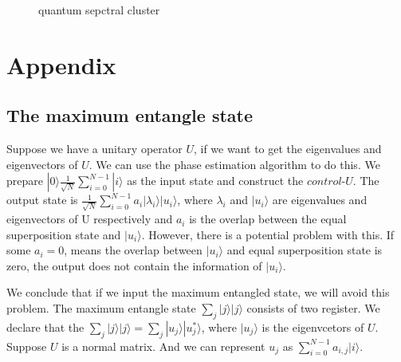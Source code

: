 \documentclass[twocolumn,notitlepage]{revtex4-1}
\def\ket#1{| #1 \rangle}
\begin{document}
\begin{figure}[H]
    \centering 
    \caption{quantum sepctral cluster}
    \label{Fig.main}
\end{figure}

\section{Appendix}

\subsection{The maximum entangle state}

Suppose we have a unitary operator $U$, if we want to get the eigenvalues and eigenvectors of $U$. We can use the phase estimation algorithm to do this. We prepare $\ket{0}\frac{1}{\sqrt{N}}\sum_{i=0}^{N-1}\ket{i}$ as the input state and construct the $control$-$U$. The output state is $\frac{1}{\sqrt{N}}\sum_{i=0}^{N-1}a_{i}\ket{\lambda_{i}}\ket{u_{i}}$, where $\lambda_{i}$ and $\ket{u_{i}}$ are eigenvalues and eigenvectors of U respectively and $a_{i}$ is the overlap between the equal superposition state and $\ket{u_{i}}$.
However, there is a potential problem with this. If some $a_{i}=0$, means the overlap between $\ket{u_{i}}$ and equal superposition state is zero, the output does not contain the information of $\ket{u_{i}}$.

We conclude that if we input the maximum entangled state, we will avoid this problem. The maximum entangle state $\sum_{j}\ket{j}\ket{j}$ consists of two register. We declare that the $\sum_{j}|j\rangle|j\rangle = \sum_{j}\ket{u_{j}}\ket{u_{j}^{*}}$, where $\ket{u_{j}}$ is the eigenvcetors of $U$. Suppose $U$ is a normal matrix. And we can represent $u_{j}$ as $\sum_{i=0}^{N-1}a_{i,j}\ket{i}$.
\end{document}
